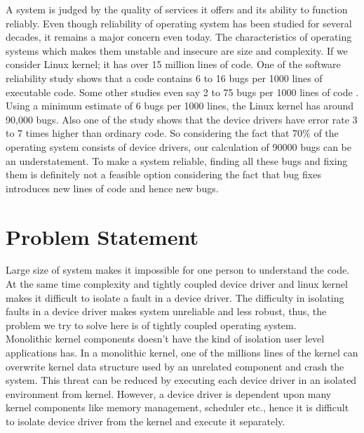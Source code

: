 
A system is judged by the quality of services it offers and its ability to function reliably. Even though reliability of operating system has been studied for several decades, it remains a major concern even today. The characteristics of operating systems which makes them unstable and insecure are size and complexity. If we consider Linux kernel; it has over 15 million lines of code. One of the software reliability study shows that a code contains 6 to 16 bugs per 1000 lines of executable code\cite{Basili:1984:SEC:69605.2085}\cite{Tanenbaum06canwe}. Some other studies even say 2 to 75 bugs per 1000 lines of code \cite{Ostrand:2002:DFL:566172.566181}. Using a minimum estimate of 6 bugs per 1000 lines, the Linux kernel has around 90,000 bugs. Also one of the study shows that the device drivers have error rate 3 to 7 times higher than ordinary code\cite{Chou:2001:ESO:502034.502042}. So considering the fact that 70\% of the operating system consists of device drivers, our calculation of 90000 bugs can be an understatement\cite{Chou:2001:ESO:502034.502042}. To make a system reliable, finding all these bugs and fixing them is definitely not a feasible option considering the fact that bug fixes introduces new lines of code and hence new bugs.

\pagebreak

\section {Problem Statement}

Large size of system makes it impossible for one person to understand the code. At the same time complexity and tightly coupled device driver and linux kernel makes it difficult to isolate a fault in a device driver. The difficulty in isolating faults in a device driver makes system unreliable and less robust, thus, the problem we try to solve here is of tightly coupled operating system. 
\\
Monolithic kernel components doesn’t have the kind of isolation user level applications has. In a monolithic kernel, one of the millions lines of the kernel can overwrite kernel data structure used by an unrelated component and crash the system. This threat can be reduced by executing each device driver in an isolated environment from kernel. However, a device driver is dependent upon many kernel components like memory management, scheduler etc., hence it is difficult to isolate device driver from the kernel and execute it separately.

